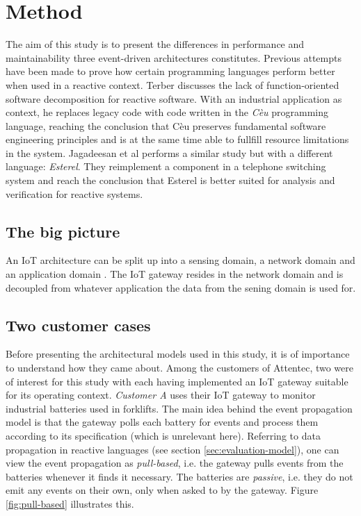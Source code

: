 \chapter{Method}
\label{cha:method}

The aim of this study is to present the differences in performance and
maintainability three event-driven architectures constitutes. Previous attempts
have been made to prove how certain programming languages perform better when
used in a reactive context. Terber \cite{terber2017function} discusses the lack
of function-oriented software decomposition for reactive software. With an
industrial application as context, he replaces legacy code with code written in
the \textit{Cèu} programming language, reaching the conclusion that Cèu
preserves fundamental software engineering principles and is at the same time
able to fullfill resource limitations in the system. Jagadeesan et al
\cite{jagadeesan1996formal} performs a similar study but with a different
language: \textit{Esterel}. They reimplement a component in a telephone
switching system and reach the conclusion that Esterel is better suited for
analysis and verification for reactive systems.

\section{The big picture}

An IoT architecture can be split up into a sensing domain, a network domain and
an application domain \cite{chen2011brief}. The IoT gateway resides in the
network domain and is decoupled from whatever application the data from the
sening domain is used for.

\section{Two customer cases}

Before presenting the architectural models used in this study, it is of
importance to understand how they came about. Among the customers of Attentec,
two were of interest for this study with each having implemented an IoT gateway
suitable for its operating context. \textit{Customer A} uses their IoT gateway
to monitor industrial batteries used in forklifts. The main idea behind the
event propagation model is that the gateway polls each battery for events and
process them according to its specification (which is unrelevant here).
Referring to data propagation in reactive languages (see section
\ref{sec:evaluation-model}), one can view the event propagation as
\textit{pull-based}, i.e. the gateway pulls events from the batteries whenever
it finds it necessary. The batteries are \textit{passive}, i.e. they do not
emit any events on their own, only when asked to by the gateway. Figure
\ref{fig:pull-based} illustrates this.

